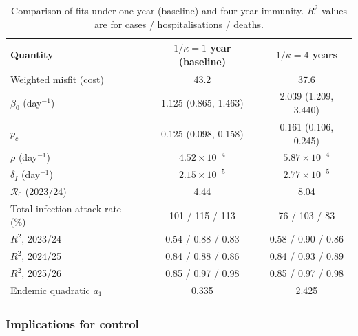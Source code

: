 \documentclass[12pt,a4paper]{article}
\theoremstyle{definition}
\theoremstyle{remark}
\begin{document}
\begin{table}[!htbp]
\caption{Comparison of fits under one-year (baseline) and four-year immunity. $R^2$ values are for cases / hospitalisations / deaths.}\label{tab:kappa_sens}
\centering
\begin{tabular}{lcc}
\hline
Quantity & $1/\kappa = 1$ year (baseline) & $1/\kappa = 4$ years\\ \hline
Weighted misfit (cost) & 43.2 & 37.6\\
$\beta_0$ (day$^{-1}$) & 1.125 (0.865, 1.463) & 2.039 (1.209, 3.440)\\
$p_c$ & 0.125 (0.098, 0.158) & 0.161 (0.106, 0.245)\\
$\rho$ (day$^{-1}$) & $4.52\times10^{-4}$ & $5.87\times10^{-4}$\\
$\delta_I$ (day$^{-1}$) & $2.15\times10^{-5}$ & $2.77\times10^{-5}$\\
$\mathcal{R}_0$ (2023/24) & 4.44 & 8.04\\
Total infection attack rate (\%) & 101 / 115 / 113 & 76 / 103 / 83\\
$R^2$, 2023/24 & 0.54 / 0.88 / 0.83 & 0.58 / 0.90 / 0.86\\
$R^2$, 2024/25 & 0.84 / 0.88 / 0.86 & 0.84 / 0.93 / 0.89\\
$R^2$, 2025/26 & 0.85 / 0.97 / 0.98 & 0.85 / 0.97 / 0.98\\
Endemic quadratic $a_1$ & 0.335 & 2.425\\
\hline
\end{tabular}
\end{table}

\subsubsection{Implications for control}
\end{document}
